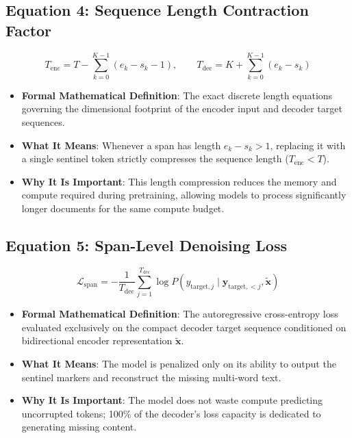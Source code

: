 \documentclass[11pt,a4paper]{article}
\theoremstyle{definition}
\begin{document}
\subsection{\textbf{Equation 4: Sequence Length Contraction Factor}}
{\boldmath
\begin{equation}
T_{\text{enc}} = T - \sum_{k=0}^{K-1} (e_k - s_k - 1), \qquad T_{\text{dec}} = K + \sum_{k=0}^{K-1} (e_k - s_k)
\end{equation}
}
\begin{itemize}
    \item \textbf{Formal Mathematical Definition}:
    The exact discrete length equations governing the dimensional footprint of the encoder input and decoder target sequences.
    \item \textbf{What It Means}:
    Whenever a span has length $e_k - s_k > 1$, replacing it with a single sentinel token strictly compresses the sequence length ($T_{\text{enc}} < T$).
    \item \textbf{Why It Is Important}:
    This length compression reduces the memory and compute required during pretraining, allowing models to process significantly longer documents for the same compute budget.
\end{itemize}

\subsection{\textbf{Equation 5: Span-Level Denoising Loss}}
{\boldmath
\begin{equation}
\mathcal{L}_{\text{span}} = -\frac{1}{T_{\text{dec}}} \sum_{j=1}^{T_{\text{dec}}} \log P(y_{\text{target}, j} \mid \mathbf{y}_{\text{target}, <j}, \tilde{\mathbf{x}})
\end{equation}
}
\begin{itemize}
    \item \textbf{Formal Mathematical Definition}:
    The autoregressive cross-entropy loss evaluated exclusively on the compact decoder target sequence conditioned on bidirectional encoder representation $\tilde{\mathbf{x}}$.
    \item \textbf{What It Means}:
    The model is penalized only on its ability to output the sentinel markers and reconstruct the missing multi-word text.
    \item \textbf{Why It Is Important}:
    The model does not waste compute predicting uncorrupted tokens; 100\% of the decoder's loss capacity is dedicated to generating missing content.
\end{itemize}
\end{document}
